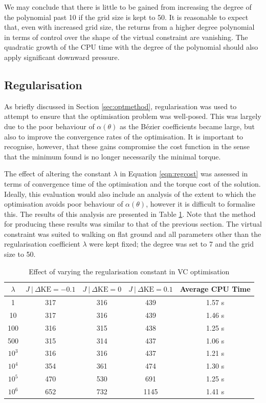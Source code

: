We may conclude that there is little to be gained from increasing the degree of the polynomial past 10 if the grid size is kept to 50. It is reasonable to expect that, even with increased grid size, the returns from a higher degree polynomial in terms of control over the shape of the virtual constraint are vanishing. The quadratic growth of the CPU time with the degree of the polynomial should also apply significant downward pressure.

\subsection{Regularisation}
As briefly discussed in Section \ref{sec:optmethod}, regularisation was used to attempt to ensure that the optimisation problem was well-posed. This was largely due to the poor behaviour of $\alpha(\theta)$ as the Bézier coefficients became large, but also to improve the convergence rates of the optimisation. It is important to recognise, however, that these gains compromise the cost function in the sense that the minimum found is no longer necessarily the minimal torque.

The effect of altering the constant $\lambda$ in Equation \ref{eqn:regcost} was assessed in terms of convergence time of the optimisation and the torque cost of the solution. Ideally, this evaluation would also include an analysis of the extent to which the optimisation avoids poor behaviour of $\alpha(\theta)$, however it is difficult to formalise this. The results of this analysis are presented in Table \ref{tab:reg}. Note that the method for producing these results was similar to that of the previous section. The virtual constraint was suited to walking on flat ground and all parameters other than the regularisation coefficient $\lambda$ were kept fixed; the degree was set to 7 and the grid size to 50.

\begin{table}
	\centering
	\begin{tabular}{c || c | c |c || c}
		$\lambda$ & $J~|~{\Delta\mathrm{KE}=-0.1}$ & $J~|~{\Delta\mathrm{KE}=0}$ & $J~|~{\Delta\mathrm{KE}=0.1}$ & Average CPU Time \\ \hline
		 1        & 317 & 316 & 439  & 1.57 s \\
		 10       & 317 & 316 & 439  & 1.46 s \\
		 100      & 316 & 315 & 438  & 1.25 s \\
		 500      & 315 & 314 & 437  & 1.06 s \\
		 $10^3$   & 316 & 316 & 437  & 1.21 s \\
		 $10^4$   & 354 & 361 & 474  & 1.30 s \\
		 $10^5$   & 470 & 530 & 691  & 1.25 s \\
		 $10^6$   & 652 & 732 & 1145  & 1.41 s \\
	\end{tabular}
	\caption{Effect of varying the regularisation constant in VC optimisation}
	\label{tab:reg}
\end{table}

